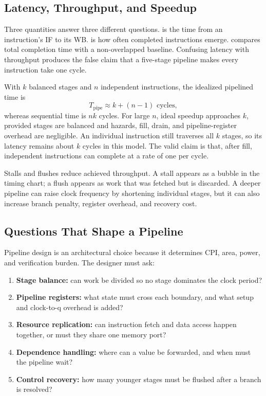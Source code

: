 \documentclass[11pt]{article}
\begin{document}
\subsection{Latency, Throughput, and Speedup}

Three quantities answer three different questions.  is the time
from an instruction's IF to its WB.  is how often completed
instructions emerge.  compares total completion time with a
non-overlapped baseline. Confusing latency with throughput produces the false
claim that a five-stage pipeline makes every instruction take one cycle.

With $k$ balanced stages and $n$ independent instructions, the idealized
pipelined time is
\[
  T_{\mathrm{pipe}}\approx k+(n-1)\text{ cycles},
\]
whereas sequential time is $nk$ cycles. For large $n$, ideal speedup
approaches $k$, provided stages are balanced and hazards, fill, drain, and
pipeline-register overhead are negligible. An individual instruction still
traverses all $k$ stages, so its latency remains about $k$ cycles in this
model. The valid claim is that, after fill, independent instructions can
complete at a rate of one per cycle.

Stalls and flushes reduce achieved throughput. A stall appears as a bubble in
the timing chart; a flush appears as work that was fetched but is discarded.
A deeper pipeline can raise clock frequency by shortening individual stages,
but it can also increase branch penalty, register overhead, and recovery cost.

\subsection{Questions That Shape a Pipeline}

Pipeline design is an architectural choice because it determines CPI, area,
power, and verification burden. The designer must ask:
\begin{enumerate}
  \item \textbf{Stage balance:} can work be divided so no stage dominates the
        clock period?
  \item \textbf{Pipeline registers:} what state must cross each boundary, and
        what setup and clock-to-q overhead is added?
  \item \textbf{Resource replication:} can instruction fetch and data access
        happen together, or must they share one memory port?
  \item \textbf{Dependence handling:} where can a value be forwarded, and
        when must the pipeline wait?
  \item \textbf{Control recovery:} how many younger stages must be flushed
        after a branch is resolved?
\end{enumerate}
\end{document}

